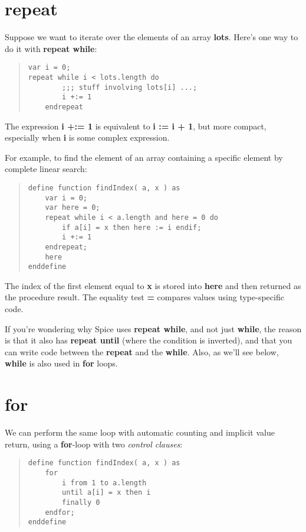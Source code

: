 \documentclass{report}
\begin{document}
\section{repeat}


Suppose we want to iterate over the elements of an array {\bf lots}.
Here's one way to do it with {\bf repeat while}:

\begin{quote}
\begin{verbatim}
var i = 0;
repeat while i < lots.length do
        ;;; stuff involving lots[i] ...;
        i +:= 1
    endrepeat
\end{verbatim}
\end{quote}


The expression {\bf i +:= 1} is equivalent to {\bf i := i + 1}, but more compact,
especially when {\bf i} is some complex expression.

For example, to find the element of an array containing a specific element by
complete linear search:

\begin{quote}
\begin{verbatim}
define function findIndex( a, x ) as
    var i = 0;
    var here = 0;
    repeat while i < a.length and here = 0 do
        if a[i] = x then here := i endif;
        i +:= 1
    endrepeat;
    here
enddefine
\end{verbatim}
\end{quote}


The index of the first element equal to {\bf x} is stored into {\bf here} and then
returned as the procedure result. The equality test {\bf =} compares values
using type-specific code.

If you're wondering why Spice uses {\bf repeat while}, and not just {\bf while}, the
reason is that it also has {\bf repeat until} (where the condition is inverted),
and that you can write code between the {\bf repeat} and the {\bf while}. Also, as
we'll see below, {\bf while} is also used in {\bf for} loops.

\section{for}


We can perform the same loop with automatic counting and implicit value
return, using a {\bf for}-loop with two {\em control clauses}:

\begin{quote}
\begin{verbatim}
define function findIndex( a, x ) as
    for
        i from 1 to a.length
        until a[i] = x then i
        finally 0
    endfor;
enddefine
\end{verbatim}
\end{quote}
\end{document}
